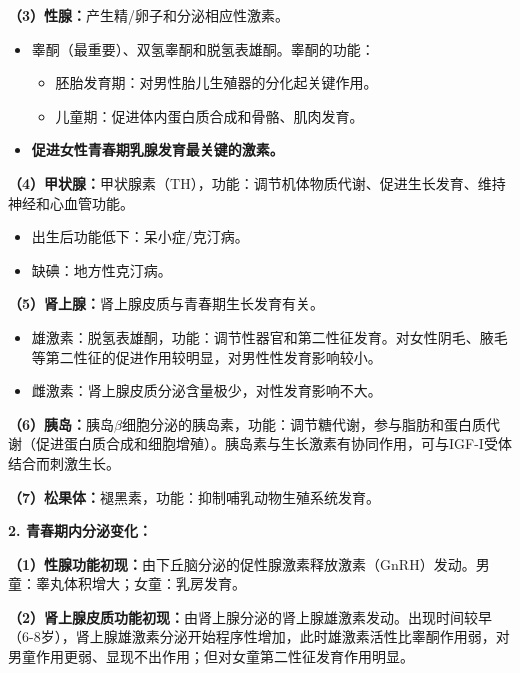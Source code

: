 \begin{keybox}
\textbf{（3）性腺：}产生精/卵子和分泌相应性激素。
\begin{itemize}[leftmargin=*]
    \item {}睾酮（最重要）、双氢睾酮和脱氢表雄酮。睾酮的功能：
    \begin{itemize}[leftmargin=*]
        \item 胚胎发育期：对男性胎儿生殖器的分化起关键作用。
        \item 儿童期：促进体内蛋白质合成和骨骼、肌肉发育。
    \end{itemize}
    \item {}\textbf{促进女性青春期乳腺发育最关键的激素。}
\end{itemize}

\textbf{（4）甲状腺：}甲状腺素（TH），功能：调节机体物质代谢、促进生长发育、维持神经和心血管功能。
\begin{itemize}[leftmargin=*]
    \item 出生后功能低下：呆小症/克汀病。
    \item 缺碘：地方性克汀病。
\end{itemize}

\textbf{（5）肾上腺：}肾上腺皮质与青春期生长发育有关。
\begin{itemize}[leftmargin=*]
    \item 雄激素：脱氢表雄酮，功能：调节性器官和第二性征发育。对女性阴毛、腋毛等第二性征的促进作用较明显，对男性性发育影响较小。
    \item 雌激素：肾上腺皮质分泌含量极少，对性发育影响不大。
\end{itemize}

\textbf{（6）胰岛：}胰岛$\beta$细胞分泌的胰岛素，功能：调节糖代谢，参与脂肪和蛋白质代谢（促进蛋白质合成和细胞增殖）。胰岛素与生长激素有协同作用，可与IGF-I受体结合而刺激生长。

\textbf{（7）松果体：}褪黑素，功能：抑制哺乳动物生殖系统发育。

\textbf{2. 青春期内分泌变化：}

\textbf{（1）性腺功能初现：}由下丘脑分泌的促性腺激素释放激素（GnRH）发动。男童：睾丸体积增大；女童：乳房发育。

\textbf{（2）肾上腺皮质功能初现：}由肾上腺分泌的肾上腺雄激素发动。出现时间较早（6-8岁），肾上腺雄激素分泌开始程序性增加，此时雄激素活性比睾酮作用弱，对男童作用更弱、显现不出作用；但对女童第二性征发育作用明显。
\end{keybox}

